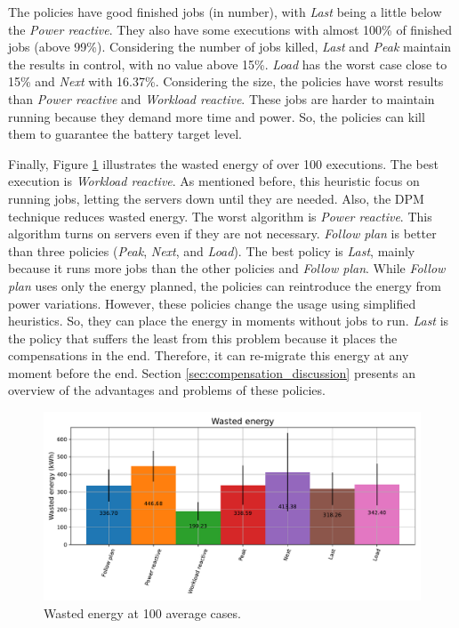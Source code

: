 The policies have good finished jobs (in number), with \emph{Last} being a little below the \emph{Power reactive}. They also have some executions with almost 100\% of finished jobs (above 99\%). Considering the number of jobs killed, \emph{Last} and \emph{Peak} maintain the results in control, with no value above 15\%. \emph{Load} has the worst case close to 15\% and \emph{Next} with 16.37\%. Considering the size, the policies have worst results than \emph{Power reactive} and \emph{Workload reactive}. These jobs are harder to maintain running because they demand more time and power. So, the policies can kill them to guarantee the battery target level.

Finally, Figure \ref{fig:energy_diff} illustrates the wasted energy of over 100 executions. The best execution is \emph{Workload reactive}. As mentioned before, this heuristic focus on running jobs, letting the servers down until they are needed. Also, the DPM technique reduces wasted energy. The worst algorithm is \emph{Power reactive}. This algorithm turns on servers even if they are not necessary. \emph{Follow plan} is better than three policies (\emph{Peak}, \emph{Next}, and \emph{Load}). The best policy is \emph{Last}, mainly because it runs more jobs than the other policies and \emph{Follow plan}. While \emph{Follow plan} uses only the energy planned, the policies can reintroduce the energy from power variations. However, these policies change the usage using simplified heuristics. So, they can place the energy in moments without jobs to run. \emph{Last} is the policy that suffers the least from this problem because it places the compensations in the end. Therefore, it can re-migrate this energy at any moment before the end. Section \ref{sec:compensation_discussion} presents an overview of the advantages and problems of these policies. 

\begin{figure}[!htb]
    \centering
    \includegraphics[scale=0.55]{Images/Compensations/energy_diff.pdf}
    \caption{Wasted energy at 100 average cases.}
    \label{fig:energy_diff}
\end{figure}

